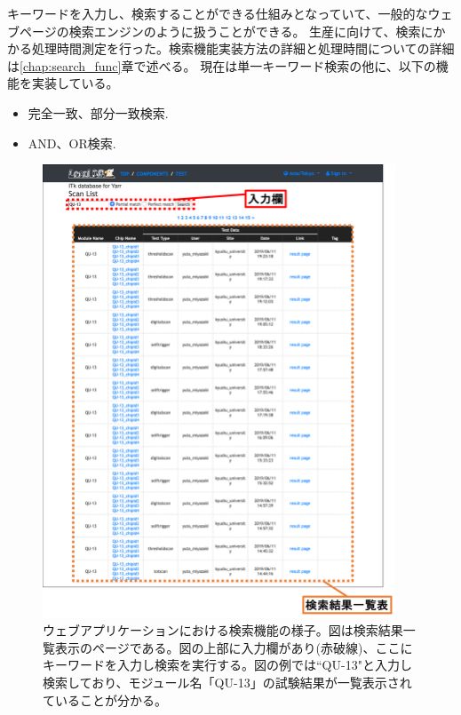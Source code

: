 キーワードを入力し、検索することができる仕組みとなっていて、一般的なウェブページの検索エンジンのように扱うことができる。
生産に向けて、検索にかかる処理時間測定を行った。検索機能実装方法の詳細と処理時間についての詳細は\ref{chap:search_func}章で述べる。
現在は単一キーワード検索の他に、以下の機能を実装している。
\begin{itemize}
  \item 完全一致、部分一致検索.
  \item AND、OR検索.
\end{itemize}

\begin{figure}[bpt]\centering
\includegraphics[width=10.5cm]{./webapp_search_function.png}
\caption[ウェブアプリケーションにおける検索機能の様子]{ウェブアプリケーションにおける検索機能の様子。図は検索結果一覧表示のページである。図の上部に入力欄があり(赤破線)、ここにキーワードを入力し検索を実行する。図の例では``QU-13"と入力し検索しており、モジュール名「QU-13」の試験結果が一覧表示されていることが分かる。}
\label{webapp_search_function}
\end{figure}


\clearpage
